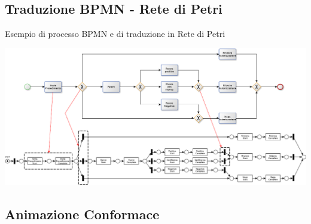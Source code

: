 \documentclass[10pt]{beamer}
\begin{document}
	\subsection{Traduzione BPMN - Rete di Petri}
	\begin{frame}{Esempio di processo BPMN e di traduzione in Rete di Petri}
	  
	  \begin{center}
	    \includegraphics[scale=0.55]{./fig/BPMNandPN}
	  \end{center}
	\end{frame}
	
	
	
	\subsection{Animazione Conformace}
	
	
\end{document}
